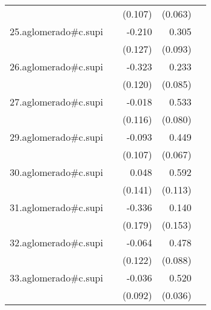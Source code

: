 {\begin{longtable}{l*{4}{D{.}{.}{-1}}}
            &                     &     (0.107)         &     (0.063)         &                     \\
\addlinespace
25.aglomerado#c.supi&                     &      -0.210         &       0.305\sym{**} &                     \\
            &                     &     (0.127)         &     (0.093)         &                     \\
\addlinespace
26.aglomerado#c.supi&                     &      -0.323\sym{**} &       0.233\sym{**} &                     \\
            &                     &     (0.120)         &     (0.085)         &                     \\
\addlinespace
27.aglomerado#c.supi&                     &      -0.018         &       0.533\sym{***}&                     \\
            &                     &     (0.116)         &     (0.080)         &                     \\
\addlinespace
29.aglomerado#c.supi&                     &      -0.093         &       0.449\sym{***}&                     \\
            &                     &     (0.107)         &     (0.067)         &                     \\
\addlinespace
30.aglomerado#c.supi&                     &       0.048         &       0.592\sym{***}&                     \\
            &                     &     (0.141)         &     (0.113)         &                     \\
\addlinespace
31.aglomerado#c.supi&                     &      -0.336         &       0.140         &                     \\
            &                     &     (0.179)         &     (0.153)         &                     \\
\addlinespace
32.aglomerado#c.supi&                     &      -0.064         &       0.478\sym{***}&                     \\
            &                     &     (0.122)         &     (0.088)         &                     \\
\addlinespace
33.aglomerado#c.supi&                     &      -0.036         &       0.520\sym{***}&                     \\
            &                     &     (0.092)         &     (0.036)         &                     \\

\end{longtable}}
